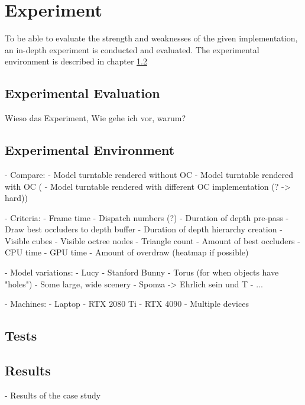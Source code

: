 \chapter{Experiment} \label{cpt-experiment}

To be able to evaluate the strength and weaknesses of the given implementation, an in-depth 
experiment is conducted and evaluated. The experimental environment is described in chapter 
\ref{sec-experimental-environment}


\section{Experimental Evaluation} \label{sec-experimental-evaluation}



Wieso das Experiment,
Wie gehe ich vor, warum?


\section{Experimental Environment} \label{sec-experimental-environment}

- Compare:
    - Model turntable rendered without OC
    - Model turntable rendered with OC
(   - Model turntable rendered with different OC implementation (? -> hard))


- Criteria: 
    - Frame time
    - Dispatch numbers (?)
    - Duration of depth pre-pass
        - Draw best occluders to depth buffer
        - Duration of depth hierarchy creation
    - Visible cubes
    - Visible octree nodes
    - Triangle count
    - Amount of best occluders
    - CPU time
    - GPU time
    - Amount of overdraw (heatmap if possible)


- Model variations:
    - Lucy
    - Stanford Bunny
    - Torus (for when objects have "holes")
    - Some large, wide scenery
    - Sponza        -> Ehrlich sein und T
    - ...


- Machines:
    - Laptop
    - RTX 2080 Ti
    - RTX 4090
    - Multiple devices


\section{Tests}




\section{Results}

- Results of the case study


